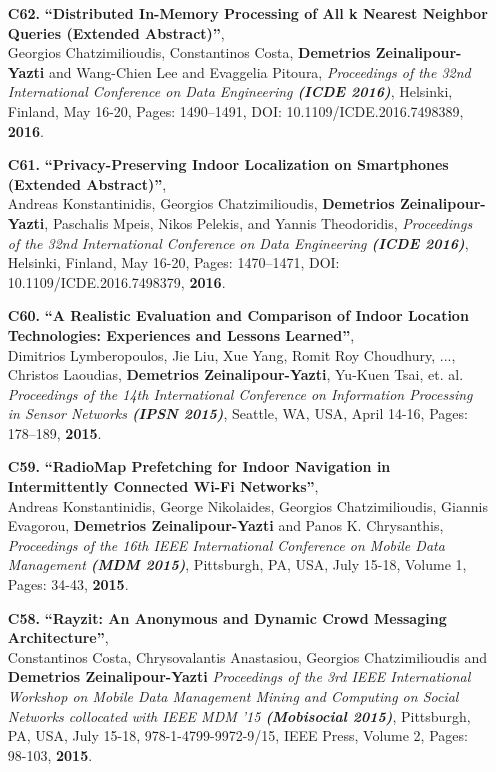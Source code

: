 \documentclass[10pt]{article}
\begin{document}
\begin{enumerate}
\item[{\bf C62.}]
\label{C62} %
{\bf ``Distributed In-Memory Processing of All k Nearest Neighbor Queries (Extended Abstract)''}, \\
Georgios Chatzimilioudis, Constantinos Costa, {\bf Demetrios Zeinalipour-Yazti} and
Wang-Chien Lee and Evaggelia Pitoura,
{\em Proceedings of the 32nd International Conference on Data Engineering {\bf (ICDE 2016)}},
Helsinki, Finland, May 16-20, Pages: 1490--1491, DOI: 10.1109/ICDE.2016.7498389, {\bf 2016}.

\item[{\bf C61.}]
\label{C61} %
{\bf ``Privacy-Preserving Indoor Localization on Smartphones (Extended Abstract)''}, \\
Andreas Konstantinidis, Georgios Chatzimilioudis, {\bf Demetrios Zeinalipour-Yazti}, Paschalis Mpeis, 
Nikos Pelekis, and Yannis Theodoridis,
{\em Proceedings of the 32nd International Conference on Data Engineering {\bf (ICDE 2016)}},
Helsinki, Finland, May 16-20, Pages: 1470--1471, DOI: 10.1109/ICDE.2016.7498379, {\bf 2016}.

\item[{\bf C60.}]
\label{C60}
{\bf ``A Realistic Evaluation and Comparison of Indoor Location Technologies: Experiences and Lessons Learned''}, \\
Dimitrios Lymberopoulos, Jie Liu, Xue Yang, Romit Roy Choudhury, ..., Christos Laoudias, {\bf Demetrios Zeinalipour-Yazti}, Yu-Kuen Tsai, et. al.
{\em Proceedings of the 14th International Conference on Information Processing in Sensor Networks {\bf (IPSN 2015)}},
Seattle, WA, USA, April 14-16, Pages: 178--189, {\bf 2015}.

\item[{\bf C59.}]
\label{C59}
{\bf ``RadioMap Prefetching for Indoor Navigation in Intermittently Connected Wi-Fi Networks''}, \\
Andreas Konstantinidis, George Nikolaides, Georgios Chatzimilioudis, Giannis Evagorou,  {\bf Demetrios Zeinalipour-Yazti} and Panos K. Chrysanthis,
{\em Proceedings of the 16th IEEE International Conference on Mobile Data Management {\bf (MDM 2015)}},
Pittsburgh, PA, USA, July 15-18, Volume 1, Pages: 34-43, {\bf 2015}.

\item[{\bf C58.}]
\label{C58}
{\bf ``Rayzit: An Anonymous and Dynamic Crowd Messaging Architecture''}, \\
Constantinos Costa, Chrysovalantis Anastasiou, Georgios Chatzimilioudis and {\bf Demetrios Zeinalipour-Yazti}
{\em Proceedings of the 3rd IEEE International Workshop on Mobile Data Management Mining and Computing on Social Networks collocated with IEEE MDM '15 {\bf (Mobisocial 2015)}},
Pittsburgh, PA, USA, July 15-18, 978-1-4799-9972-9/15, IEEE Press, Volume 2, Pages: 98-103, {\bf 2015}.


\end{enumerate}
\end{document}
